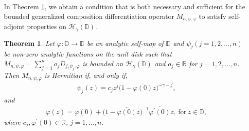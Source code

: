 \documentclass[12pt, reqno]{amsart}
\newtheorem{theorem}{Theorem}[section]
\theoremstyle{definition}
\theoremstyle{remark}
\numberwithin{equation}{section}
\begin{document}
 In Theorem \ref{Thm_4}, we obtain a condition that is both necessary and sufficient for the  bounded generalized composition differentiation operator $M_{n,\psi,\varphi}$ to satisfy self-adjoint properties on  $\mathcal{H}_\gamma(\mathbb{D})$.

\begin{theorem}\label{Thm_4}
	Let $\varphi: \mathbb{D}\longrightarrow \mathbb{D}$ be an analytic self-map of $\mathbb{D}$ and $\psi_j (j=1, 2, \dots, n)$ be non-zero analytic functions on the unit disk such that $M_{n, \psi, \varphi}=\displaystyle\sum_{j=1}^{n}a_jD_{j,\psi_j, \varphi} $ is bounded on $\mathcal{H}_\gamma(\mathbb{D})$ and $a_j\in \mathbb{R}$ for $j=1, 2, \dots, n$. Then $M_{n,\psi,\varphi}$ is Hermitian if, and only if,
	\begin{gather*}
	\psi_j(z)=c_jz^{j}\big(1- \overline{\varphi(0)} z\big)^{-\gamma-j},
	\end{gather*}
	and 
	\begin{gather*}
	\varphi(z)=\varphi(0)+\big(1- \overline{\varphi(0)} z\big)^{-1}\overline{\varphi^{\prime}(0)}z,~ \mbox{for}~ z\in \mathbb{D},
	\end{gather*}
	where $c_j, \varphi^\prime(0)\in \mathbb{R}$, $j=1, \dots, n$.
\end{theorem}
\end{document}
